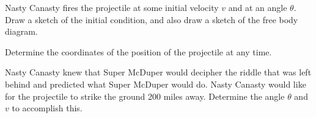 \begin{problem}
  \begin{subproblem}
  \item Nasty Canasty fires the projectile at some initial velocity
    $v$ and at an angle $\theta$. Draw a sketch of the initial
    condition, and also draw a sketch of the free body diagram.

    \vfill

  \item Determine the coordinates of the position of the projectile at
    any time.

    \vfill

    \clearpage

  \item Nasty Canasty knew that Super McDuper would decipher the
    riddle that was left behind and predicted what Super McDuper would
    do. Nasty Canasty would like for the projectile to strike the
    ground 200 miles away. Determine the angle $\theta$ and $v$ to
    accomplish this.

    \vfill

  \end{subproblem}
\end{problem}




